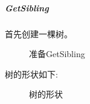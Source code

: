 \documentclass[supercite]{Experimental_Report}
\theoremstyle{definition}
\begin{document}
\clearpage
\subparagraph{GetSibling}
\noindent
首先创建一棵树。
\begin{figure}[htbp]
	\centering
	\centering
	\caption{准备GetSibling}
	\label{fig5-23}
\end{figure}

\noindent
树的形状如下:
\begin{figure}[htbp]
	\centering
	\centering
	\caption{树的形状}
	\label{fig5-24}
\end{figure}
\end{document}
